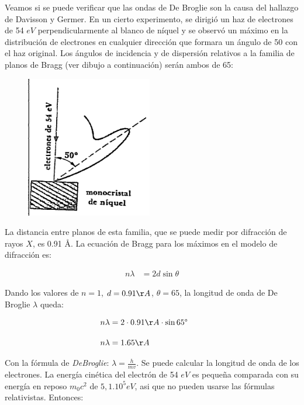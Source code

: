 \documentclass[a4paper]{article}
\begin{document}
    \indent Veamos si se puede verificar que las ondas de De Broglie son la causa del hallazgo de Davisson y Germer. En un cierto experimento, se dirigió un haz de electrones de 54 $eV$ perpendicularmente al blanco de níquel y se observó un máximo en la distribución de electrones en cualquier dirección que formara un ángulo de {50\textdegree} con el haz original. Los ángulos de incidencia y de dispersión relativos a la familia de planos de Bragg (ver dibujo a continuación) serán ambos de {65\textdegree}:

    \begin{figure}[h!]
        \centering
        \includegraphics[width = 5.5cm]{../imagenes/figura3-7.png}
    \end{figure}

    \newpage
    \noindent
    \thispagestyle{fancy}

    \indent La distancia entre planos de esta familia, que se puede medir por difracción de rayos $X$, es 0.91 \AA. La ecuación de Bragg para los máximos en el modelo de difracción es: 


    \begin{align}
        n\lambda &= 2d \sin \theta \tag*{}
    \end{align}

\indent Dando los valores de $n=1$, $d=0.91 \AA$, {$\theta=65$\textdegree}, la longitud de onda de De Broglie $\lambda$ queda:

    \begin{align}
        n\lambda &= 2 \cdot 0.91 \AA  \cdot \sin {65\text{\textdegree}} \tag*{} \\[10pt]
        n\lambda &= 1.65 \AA \tag*{}
    \end{align}

    \indent Con la fórmula de \textit{DeBroglie}: $\lambda=\frac{h}{mv}$. Se puede calcular la longitud de onda de los electrones. La energía cinética del electrón de 54 $eV$ es pequeña comparada con su energía en reposo $m_0c^2$ de $5,1 . 10^5 eV$, asi que no pueden usarse las fórmulas relativistas. Entonces:
\end{document}
